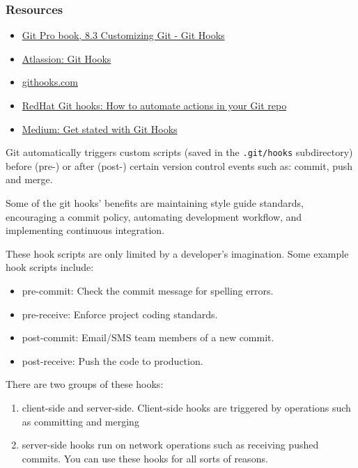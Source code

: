 \subsubsection{Resources}%
\begin{itemize}
  \item \href{https://git-scm.com/book/en/v2/Customizing-Git-Git-Hooks}{Git Pro book, 8.3 Customizing Git - Git Hooks} 
  \item \href{https://www.atlassian.com/git/tutorials/git-hooks}{Atlassion: Git Hooks} 
  \item \href{https://githooks.com/}{githooks.com} 
  \item \href{https://www.redhat.com/sysadmin/git-hooks}{RedHat Git hooks: How to automate actions in your Git repo}
  \item \href{https://medium.com/@f3igao/get-started-with-git-hooks-5a489725c639}{Medium: Get stated with Git Hooks} 
\end{itemize}
Git automatically triggers custom scripts (saved in the \texttt{.git/hooks} subdirectory) before (pre-) or after (post-) certain version control events such as: commit, push and merge.

Some of the git hooks' benefits are maintaining style guide standards, encouraging a commit policy, automating development workflow, and implementing continuous integration.

These hook scripts are only limited by a developer's imagination. Some example hook scripts include:
\begin{itemize}
  \item    pre-commit: Check the commit message for spelling errors.
  \item    pre-receive: Enforce project coding standards.
  \item    post-commit: Email/SMS team members of a new commit.
  \item    post-receive: Push the code to production.
\end{itemize}


There are two groups of these hooks: 

\begin{enumerate}
  \item client-side and server-side. Client-side hooks are triggered by operations such as committing and merging
  \item server-side hooks run on network operations such as receiving pushed commits. You can use these hooks for all sorts of reasons.
\end{enumerate}




